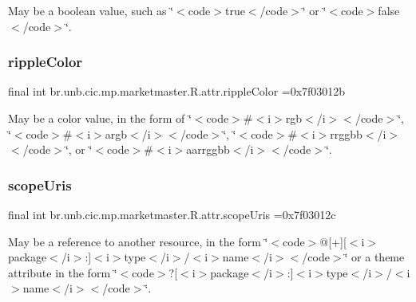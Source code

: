 May be a boolean value, such as \char`\"{}$<$code$>$true$<$/code$>$\char`\"{} or \char`\"{}$<$code$>$false$<$/code$>$\char`\"{}. \mbox{\label{classbr_1_1unb_1_1cic_1_1mp_1_1marketmaster_1_1R_1_1attr_a978243a13f1c4588547667ca78953f19}} 
\subsubsection{\texorpdfstring{ripple\+Color}{rippleColor}}
{\footnotesize\ttfamily final int br.\+unb.\+cic.\+mp.\+marketmaster.\+R.\+attr.\+ripple\+Color =0x7f03012b\hspace{0.3cm}{\ttfamily [static]}}

May be a color value, in the form of \char`\"{}$<$code$>$\#$<$i$>$rgb$<$/i$>$$<$/code$>$\char`\"{}, \char`\"{}$<$code$>$\#$<$i$>$argb$<$/i$>$$<$/code$>$\char`\"{}, \char`\"{}$<$code$>$\#$<$i$>$rrggbb$<$/i$>$$<$/code$>$\char`\"{}, or \char`\"{}$<$code$>$\#$<$i$>$aarrggbb$<$/i$>$$<$/code$>$\char`\"{}. \mbox{\label{classbr_1_1unb_1_1cic_1_1mp_1_1marketmaster_1_1R_1_1attr_a4c9a02aeb54e873d6ddb8a4a0d68258d}} 
\subsubsection{\texorpdfstring{scope\+Uris}{scopeUris}}
{\footnotesize\ttfamily final int br.\+unb.\+cic.\+mp.\+marketmaster.\+R.\+attr.\+scope\+Uris =0x7f03012c\hspace{0.3cm}{\ttfamily [static]}}

May be a reference to another resource, in the form \char`\"{}$<$code$>$@\mbox{[}+\mbox{]}\mbox{[}$<$i$>$package$<$/i$>$\+:\mbox{]}$<$i$>$type$<$/i$>$/$<$i$>$name$<$/i$>$$<$/code$>$\char`\"{} or a theme attribute in the form \char`\"{}$<$code$>$?\mbox{[}$<$i$>$package$<$/i$>$\+:\mbox{]}$<$i$>$type$<$/i$>$/$<$i$>$name$<$/i$>$$<$/code$>$\char`\"{}. 

